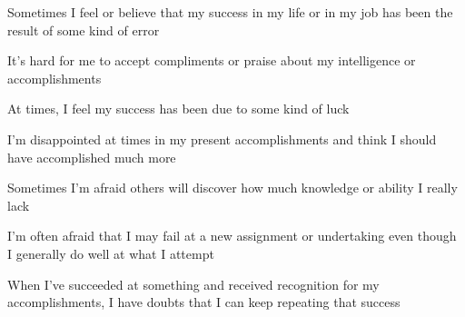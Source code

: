 \documentclass[aspectratio=169]{beamer}
\begin{document}
\begin{frame}
  \begin{center}
    \Huge  Sometimes I feel or believe that my success in my life or in my job has been the result of some kind of error
  \end{center}
\end{frame}

\begin{frame}
  \begin{center}
    \Huge    It’s  hard  for  me  to  accept  compliments  or  praise  about  my  intelligence  or  accomplishments
  \end{center}
\end{frame}

\begin{frame}
  \begin{center}
    \Huge At times, I feel my success has been due to some kind of luck
  \end{center}
\end{frame}

\begin{frame}
  \begin{center}
    \Huge   I’m  disappointed  at  times  in  my  present  accomplishments  and  think  I should have accomplished much more
\end{center}
\end{frame}

\begin{frame}
  \begin{center}
    \Huge   Sometimes I’m afraid others will discover how much knowledge or ability I really lack
  \end{center}
\end{frame}

\begin{frame}
  \begin{center}
    \Huge     I’m  often  afraid  that  I  may  fail  at  a  new  assignment  or  undertaking  even  though  I  generally  do  well  at  what  I
  attempt
\end{center}
\end{frame}

\begin{frame}
  \begin{center}
    \Huge   When  I’ve  succeeded  at  something  and  received  recognition  for  my  accomplishments,  I  have  doubts  that I can keep repeating that success
\end{center}
\end{frame}
\end{document}
